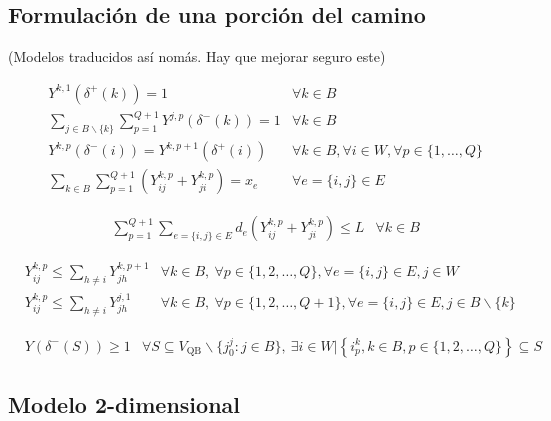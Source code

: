 \documentclass[10pt, a4paper]{article}
\theoremstyle{definition}
\begin{document}
\subsection{Formulación de una porción del camino}

(Modelos traducidos así nomás. Hay que mejorar seguro este)

\begin{align}
	& Y^{k, 1}\left(\delta^{+}(k)\right)=1 & \forall k \in B \label{eq:22} \\
	& \sum_{j \in B \backslash\{k\}} \sum_{p=1}^{Q+1} Y^{j, p}\left(\delta^{-}(k)\right)=1 & \forall k \in B \label{eq:23} \\
	& Y^{k, p}\left(\delta^{-}(i)\right)=Y^{k, p+1}\left(\delta^{+}(i)\right) & \forall k \in B, \forall i \in W, \forall p \in\{1, \ldots, Q\} \label{eq:24} \\
	& \sum_{k \in B} \sum_{p=1}^{Q+1}\left(Y_{i j}^{k, p}+Y_{j i}^{k, p}\right)=x_{e} & \forall e=\{i, j\} \in E \label{eq:25}
\end{align}

\begin{align}
	& \sum_{p=1}^{Q+1} \sum_{e=\{i, j\} \in E} d_{e}\left(Y_{i j}^{k, p}+Y_{j i}^{k, p}\right) \leq L & \forall k \in B \label{eq:26}
\end{align}

\begin{align}
	& Y_{i j}^{k, p} \leq \sum_{h \neq i} Y_{j h}^{k, p+1} & \forall k \in B,\ \forall p \in\{1,2, \ldots, Q\}, \forall e=\{i, j\} \in E, j \in W \label{eq:27} \\
	& Y_{i j}^{k, p} \leq \sum_{h \neq i} Y_{j h}^{j, 1} & \forall k \in B,\ \forall p \in\{1,2, \ldots, Q+1\}, \forall e=\{i, j\} \in E, j \in B \backslash\{k\} \label{eq:28}
\end{align}

\begin{align}
	& Y\left(\delta^{-}(S)\right) \geq 1 & \forall S \subseteq V_{\mathrm{QB}} \backslash\{j_{0}^{j} : j \in B\},\ \exists i \in W |\left\{i_{p}^{k}, k \in B, p \in\{1,2, \ldots, Q\}\right\} \subseteq S \label{eq:29}
\end{align}

\subsection{Modelo 2-dimensional}
\end{document}
